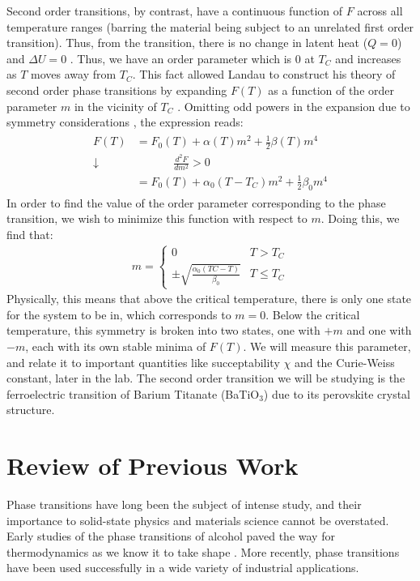 \documentclass[%
 reprint,
 amsmath,amssymb,
 aps,
 pra,
]{revtex4-1}
\begin{document}
Second order transitions, by contrast, have a continuous function of $F$ across all temperature ranges (barring the material being subject to an unrelated first order transition). Thus, from the transition, there is no change in latent heat ($Q = 0$) and $\Delta U = 0$ \cite{manual}. Thus, we have an order parameter which is $0$ at $T_C$ and increases as $T$ moves away from $T_C$. This fact allowed Landau to construct his theory of second order phase transitions by expanding $F(T)$ as a function of the order parameter $m$ in the vicinity of $T_C$ \cite{manual, phase_1}. Omitting odd powers in the expansion due to symmetry considerations \cite{manual}, the expression reads:
\begin{gather}
	\begin{align}
	F\left(T\right) 	& = F_0\left(T\right)+\alpha(T) m^2+\frac{1}{2}\beta(T) m^4 \nonumber \\
	\downarrow 		& ~~~~~~~~~~~~~~~ \frac{d^2F}{dm^2} > 0 \nonumber \\
					& =F_0\left(T\right)+\alpha_0(T - T_C) m^2+\frac{1}{2}\beta_0 m^4 \nonumber
	\end{align}
\end{gather}
In order to find the value of the order parameter corresponding to the phase transition, we wish to minimize this function with respect to $m$. Doing this, we find that:
\begin{gather}
	m = 	\begin{cases}
			0 & T > T_C \\
			\pm \sqrt{\frac{\alpha_0 (TC - T)}{\beta_0}} & T \le T_C
		\end{cases} \nonumber
\end{gather}
Physically, this means that above the critical temperature, there is only one state for the system to be in, which corresponds to $m = 0$. Below the critical temperature, this symmetry is broken into two states, one with $+m$ and one with $-m$, each with its own stable minima of $F(T)$. We will measure this parameter, and relate it to important quantities like succeptability $\chi$ and the Curie-Weiss constant, later in the lab. The second order transition we will be studying is the ferroelectric transition of Barium Titanate (BaTiO$_3$) due to its perovskite crystal structure.

\section{Review of Previous Work}

Phase transitions have long been the subject of intense study, and their importance to solid-state physics and materials science cannot be overstated. Early studies of the phase transitions of alcohol paved the way for thermodynamics as we know it to take shape \cite{phase_history}. More recently, phase transitions have been used successfully in a wide variety of industrial applications.
\end{document}
